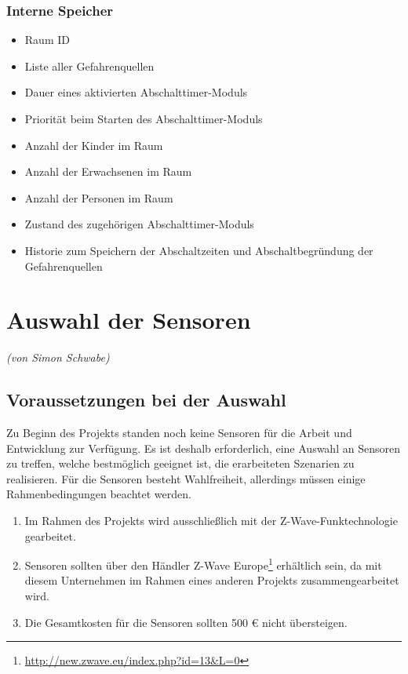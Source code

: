 \subsubsection{Interne Speicher}
\begin{itemize}
	\item Raum ID
	\item Liste aller Gefahrenquellen
	\item Dauer eines aktivierten Abschalttimer-Moduls
	\item Priorität beim Starten des Abschalttimer-Moduls
	\item Anzahl der Kinder im Raum
	\item Anzahl der Erwachsenen im Raum
	\item Anzahl der Personen im Raum
	\item Zustand des zugehörigen Abschalttimer-Moduls
	\item Historie zum Speichern der Abschaltzeiten und Abschaltbegründung der Gefahrenquellen
\end{itemize}

\section{Auswahl der Sensoren}
\label{sec:sensorAuswahl}
\emph{(von Simon Schwabe)}

\subsection{Voraussetzungen bei der Auswahl}
Zu Beginn des Projekts standen noch keine Sensoren für die Arbeit und Entwicklung zur Verfügung. Es ist deshalb erforderlich, eine Auswahl an Sensoren zu treffen, welche bestmöglich geeignet ist, die erarbeiteten Szenarien zu realisieren. Für die Sensoren besteht Wahlfreiheit, allerdings müssen einige Rahmenbedingungen beachtet werden.

\begin{enumerate}
	\item Im Rahmen des Projekts wird ausschließlich mit der Z-Wave-Funktechnologie gearbeitet.
	\item Sensoren sollten über den Händler Z-Wave Europe\footnote{\url{http://new.zwave.eu/index.php?id=13\&L=0}} erhältlich sein, da mit diesem Unternehmen im Rahmen eines anderen Projekts zusammengearbeitet wird.
	\item Die Gesamtkosten für die Sensoren sollten 500 € nicht übersteigen.
\end{enumerate}

